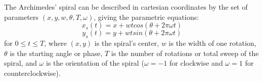 \documentclass[11pt]{IEEEtran}
\begin{document}
The Archimedes' spiral can be described in cartesian coordinates by the set of parameters \begin{math}(x,y,w,\theta,T,\omega)\end{math}, giving the parametric equations:
\begin{equation} 
\label{eq:2} 
	x_{s}(t) = x + wt cos(\theta + 2\pi\omega t)
\end{equation}
\begin{equation}
\label{eq:3} 
	y_{s}(t) = y + wt sin(\theta + 2\pi\omega t) 
\end{equation}
for \begin{math}0 \leq t \leq T\end{math}, where \begin{math}(x,y)\end{math} is the spiral's center, \begin{math}w\end{math} is the width of one rotation, \begin{math}\theta\end{math} is the starting angle or phase, \begin{math}T\end{math} is the number of rotations or total sweep of the spiral, and \begin{math}\omega\end{math} is the orientation of the spiral (\begin{math}\omega = -1\end{math} for clockwise and \begin{math}\omega = 1\end{math} for counterclockwise).
\end{document}
